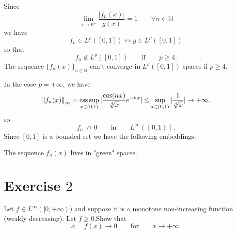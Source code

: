 \documentclass[a4paper, twoside, openany]{book}
\newcommand{\esssup}{\operatornamewithlimits{ess\,sup}}
\newcommand{\norm}[1]{\left\lVert#1\right\rVert}
\begin{document}
Since
$$\lim_{x \rightarrow 0^+} \frac{|f_n(x)|}{g(x)} = 1 \qquad \forall n \in \mathbb{N}$$
we have
$$f_n \in L^p([0, 1]) \leftrightarrow g \in L^p([0, 1])$$
so that
$$f_n \notin L^p([0, 1]) \qquad \textrm{if} \qquad p \geq 4.$$
The sequence $\{ f_n(x) \}_{n \in \mathbb{N}}$ can't converge in $L^p([0, 1])$ spaces if $p \geq 4$. \par 
In the case $p = +\infty$, we have
$$\norm{f_n(x)}_{\infty} = \esssup_{x \in (0, 1)} |\frac{\cos(nx)}{\sqrt[4]{x}}e^{-nx}| \leq \sup_{x \in (0,1)} |\frac{1}{\sqrt[4]{x}}| \rightarrow +\infty,$$
so
$$f_n \nrightarrow 0 \qquad \textrm{in} \qquad L^{\infty}((0, 1)).$$		
Since $[0, 1]$ is a bounded set we have the following embeddings:	
\begin{figure}[!ht]
\begin{center}
\end{center}
\end{figure}							
The sequence $f_n(x)$ lives in "green" spaces.
\clearpage
\section*{Exercise $2$}
Let $f \in L^{\infty}([0, +\infty))$ and suppose it is a monotone non-increasing function (weakly decreasing). Let $f \geq 0$.Show that
$$x = f(x) \rightarrow 0 \qquad \textrm{for} \qquad x \rightarrow + \infty.$$
\end{document}
